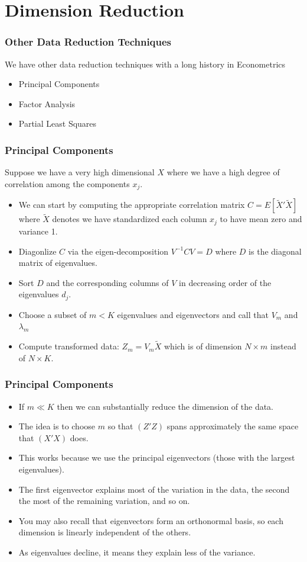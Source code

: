 \section{Dimension Reduction}

\begin{frame}
\frametitle{Other Data Reduction Techniques}
We have other data reduction techniques with a long history in Econometrics
\begin{itemize}
\item Principal Components
\item Factor Analysis
\item Partial Least Squares
\end{itemize}
\end{frame}

\begin{frame}
\frametitle{Principal Components}
Suppose we have a very high dimensional $X$ where we have a high degree of correlation among the components $x_j$. 
\begin{itemize}
\item We can start by computing the appropriate correlation matrix $C=E[\tilde{X}'\tilde{X}]$ where $\tilde{X}$ denotes we have standardized each column $x_j$ to have mean zero and variance 1.
\item Diagonlize $C$ via the eigen-decomposition $V^{-1} C V = D$ where $D$ is the diagonal matrix of eigenvalues.
\item Sort $D$ and the corresponding columns of $V$ in decreasing order of the eigenvalues $d_j$.
\item Choose a subset of $m < K$ eigenvalues and eigenvectors and call that $V_m$ and $\lambda_m$
\item Compute transformed data: $Z_m = V_m \tilde{X}$ which is of dimension $N \times m$ instead of $N \times K$.
\end{itemize}
\end{frame}

\begin{frame}
\frametitle{Principal Components}
\begin{itemize}
\item If $m \ll K$ then we can substantially reduce the dimension of the data.
\item The idea is to choose $m$ so that $(Z'Z)$ spans approximately the same space that $(X'X)$ does.
\item This works because we use the \alert{principal eigenvectors} (those with the largest eigenvalues).
\item The first eigenvector explains most of the variation in the data, the second the most of the remaining variation, and so on.
\item You may also recall that eigenvectors form an \alert{orthonormal basis}, so each dimension is linearly independent of the others.
\item As eigenvalues decline, it means they explain less of the variance.
\end{itemize}
\end{frame}

